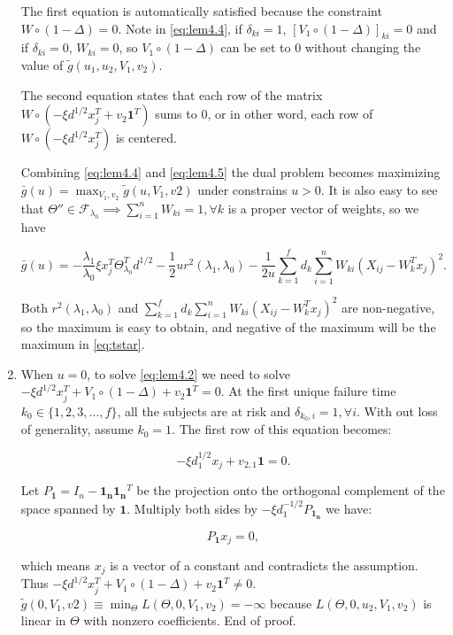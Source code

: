 \begin{enumerate}
The first equation is automatically satisfied because the constraint $W\circ(1-\Delta)=0$. Note in \eqref{eq:lem4.4}, if $\delta_{ki}=1$, $[V_1\circ(1-\Delta)]_{ki}=0$ and if $\delta_{ki}=0$, $W_{ki}=0$, so $V_1\circ(1-\Delta)$ can be set to 0 without changing the value of $\tilde{g}(u_1,u_2,V_1,v_2)$.

The second equation states that each row of the matrix $W\circ\left( -\xi d^{1/2} x_j^T+v_2\mathbf{1}^T\right)$ sums to 0, or in other word, each row of $W\circ\left(-\xi d^{1/2}x_j^T\right)$ is centered.

Combining \eqref{eq:lem4.4} and \eqref{eq:lem4.5} the dual problem  becomes maximizing $\bar{g}(u)=\max_{V_1,v_2}\tilde{g}(u,V_1,v2)$ under constrains $u>0$. It is also easy to see that $\Theta''\in\mathcal{F}_{\lambda_0}\implies\sum_{i=1}^nW_{ki}=1,\forall k$ is a proper vector of weights, so we have

\begin{equation}
    \label{eq:lem4.6}
    \bar{g}(u)=-\frac{\lambda_1}{\lambda_0}\xi x_j^T\Theta_{\lambda_0}^Td^{1/2}-\frac{1}{2}ur^2(\lambda_1,\lambda_0)-\frac{1}{2u}\sum_{k=1}^fd_k\sum_{i=1}^nW_{ki}\left(X_{ij}-W_k^Tx_j\right)^2.
\end{equation}
 
 Both $r^2(\lambda_1,\lambda_0)$ and $\sum_{k=1}^fd_k\sum_{i=1}^nW_{ki}\left(X_{ij}-W_k^Tx_j\right)^2$ are non-negative, so the maximum is easy to obtain, and negative of the maximum will be the maximum in \eqref{eq:tstar}.

\item When $u=0$, to solve \eqref{eq:lem4.2} we need to solve $-\xi d^{1/2} x_j^T+V_1\circ(1-\Delta)+v_2\mathbf{1}^T=0.$ At the first unique failure time $k_0\in\{1,2,3,...,f\}$, all the subjects are at risk and $\delta_{k_0,i}=1,\forall i$. With out loss of generality, assume $k_0=1$. The first row of this equation becomes:

\begin{equation}
    -\xi d_1^{1/2}x_j + v_{2,1}\mathbf{1}=0.
\end{equation}

Let $P_{\mathbf{1}}=I_n-\mathbf{1_n}\mathbf{1_n}^T$ be the projection onto the orthogonal complement of the space spanned by $\mathbf{1}$. Multiply both sides by $-\xi d^{-1/2}_1P_{\mathbf{1_n}}$ we have:

\begin{equation}
    \label{eq:lem4.7}
     P_{\mathbf{1}}x_j=0,
\end{equation}

which means $x_j$ is a vector of a constant and contradicts the assumption. Thus $-\xi d^{1/2} x_j^T+V_1\circ(1-\Delta)+v_2\mathbf{1}^T\neq0.$ $\tilde{g}(0,V_1,v2)\equiv\min_\Theta L(\Theta,0,V_1,v_2)=-\infty$ because $L(\Theta,0,u_2,V_1,v_2)$ is linear in $\Theta$ with nonzero coefficients. End of proof.


\end{enumerate}


